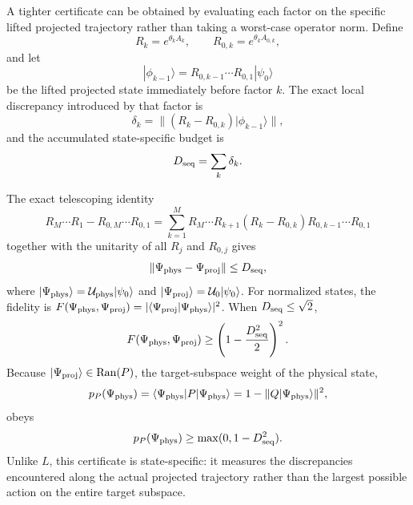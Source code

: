 \documentclass[
 aip,
 jcp,
 amsmath,amssymb,
 preprint
]{revtex4-2}
\begin{document}
A tighter certificate can be obtained by evaluating each factor on the specific lifted projected trajectory rather than taking a worst-case operator norm.
Define
\begin{equation}
R_k=e^{\theta_kA_k},
\qquad
R_{0,k}=e^{\theta_kA_{0,k}},
\end{equation}
and let
\begin{equation}
|\phi_{k-1}\rangle
=
R_{0,k-1}\cdots R_{0,1}|\psi_0\rangle
\end{equation}
be the lifted projected state immediately before factor $k$.
The exact local discrepancy introduced by that factor is
\begin{equation}
\delta_k
=
\|(R_k-R_{0,k})|\phi_{k-1}\rangle\|,
\end{equation}
and the accumulated state-specific budget is
\begin{equation}
D_{\rm seq}=\sum_k\delta_k.
\label{eq:Dseq}
\end{equation}

The exact telescoping identity
\begin{equation}
R_M\cdots R_1-R_{0,M}\cdots R_{0,1}
=
\sum_{k=1}^{M}
R_M\cdots R_{k+1}(R_k-R_{0,k})R_{0,k-1}\cdots R_{0,1}
\end{equation}
together with the unitarity of all $R_j$ and $R_{0,j}$ gives
\begin{equation}
\|\Psi_{\rm phys}-\Psi_{\rm proj}\|
\le D_{\rm seq},
\end{equation}
where
$|\Psi_{\rm phys}\rangle=\mathcal U_{\rm phys}|\psi_0\rangle$
and
$|\Psi_{\rm proj}\rangle=\mathcal U_0|\psi_0\rangle$.
For normalized states, the fidelity is
$F(\Psi_{\rm phys},\Psi_{\rm proj})
=|\langle\Psi_{\rm proj}|\Psi_{\rm phys}\rangle|^2$.
When $D_{\rm seq}\le\sqrt2$,
\begin{equation}
F(\Psi_{\rm phys},\Psi_{\rm proj})
\ge
\left(1-\frac{D_{\rm seq}^2}{2}\right)^2.
\label{eq:Fcert}
\end{equation}
Because $|\Psi_{\rm proj}\rangle\in\operatorname{Ran}(P)$, the target-subspace weight of the physical state,
\[
p_P(\Psi_{\rm phys})
=
\langle\Psi_{\rm phys}|P|\Psi_{\rm phys}\rangle
=
1-\|Q|\Psi_{\rm phys}\rangle\|^2,
\]
obeys
\begin{equation}
p_P(\Psi_{\rm phys})
\ge
\max(0,1-D_{\rm seq}^2).
\label{eq:Pcert}
\end{equation}
Unlike $L$, this certificate is state-specific: it measures the discrepancies encountered along the actual projected trajectory rather than the largest possible action on the entire target subspace.
\end{document}
